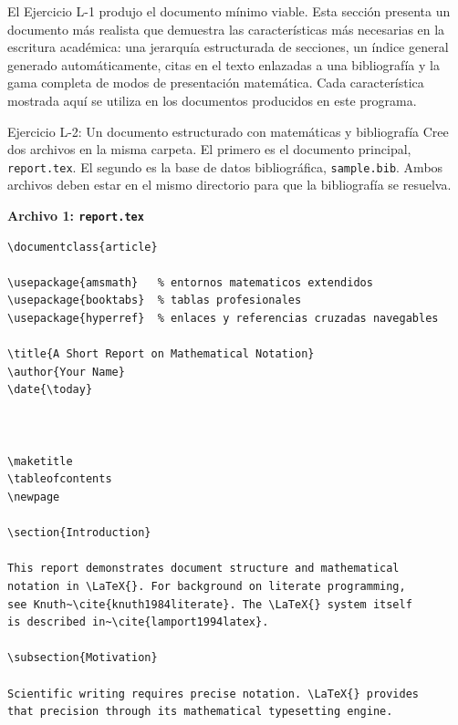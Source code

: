 El Ejercicio L-1 produjo el documento mínimo viable. Esta sección
presenta un documento más realista que demuestra las características
más necesarias en la escritura académica: una jerarquía estructurada
de secciones, un índice general generado automáticamente, citas en el
texto enlazadas a una bibliografía y la gama completa de modos de
presentación matemática. Cada característica mostrada aquí se utiliza
en los documentos producidos en este programa.

\begin{infobox}{Ejercicio L-2: Un documento estructurado con matemáticas y bibliografía}
Cree dos archivos en la misma carpeta. El primero es el documento
principal, \texttt{report.tex}. El segundo es la base de datos
bibliográfica, \texttt{sample.bib}. Ambos archivos deben estar en el
mismo directorio para que la bibliografía se resuelva.

\vs
\noindent
\textbf{Archivo 1: \texttt{report.tex}}

\begin{lstlisting}[style=inlineStyle]
\documentclass{article}

\usepackage{amsmath}   % entornos matematicos extendidos
\usepackage{booktabs}  % tablas profesionales
\usepackage{hyperref}  % enlaces y referencias cruzadas navegables

\title{A Short Report on Mathematical Notation}
\author{Your Name}
\date{\today}



\maketitle
\tableofcontents
\newpage

\section{Introduction}

This report demonstrates document structure and mathematical
notation in \LaTeX{}. For background on literate programming,
see Knuth~\cite{knuth1984literate}. The \LaTeX{} system itself
is described in~\cite{lamport1994latex}.

\subsection{Motivation}

Scientific writing requires precise notation. \LaTeX{} provides
that precision through its mathematical typesetting engine.


\end{lstlisting}
\end{infobox}

